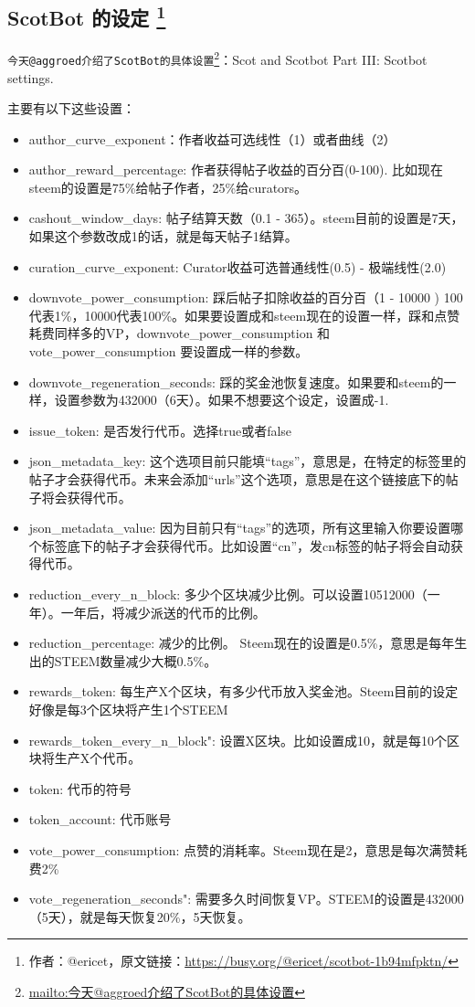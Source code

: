 \documentclass[]{ctexbook}
\providecommand{\tightlist}{%
  \setlength{\itemsep}{0pt}\setlength{\parskip}{0pt}}
\renewcommand{\href}[2]{#2\footnote{\url{#1}}}
\begin{document}
\hypertarget{scotbot-settings}{%
\subsection[ScotBot 的设定 ]{\texorpdfstring{ScotBot 的设定 \footnote{作者：@ericet，原文链接：\url{https://busy.org/@ericet/scotbot-1b94mfpktn/}}}{ScotBot 的设定 }}\label{scotbot-settings}}

\href{mailto:今天@aggroed介绍了ScotBot的具体设置}{\nolinkurl{今天@aggroed介绍了ScotBot的具体设置}}：Scot and Scotbot Part III: Scotbot settings.

主要有以下这些设置：

\begin{itemize}
\tightlist
\item
  author\_curve\_exponent：作者收益可选线性（1）或者曲线（2）
\item
  author\_reward\_percentage: 作者获得帖子收益的百分百(0-100). 比如现在steem的设置是75\%给帖子作者，25\%给curators。
\item
  cashout\_window\_days: 帖子结算天数（0.1 - 365）。steem目前的设置是7天，如果这个参数改成1的话，就是每天帖子1结算。
\item
  curation\_curve\_exponent: Curator收益可选普通线性(0.5) - 极端线性(2.0)
\item
  downvote\_power\_consumption: 踩后帖子扣除收益的百分百（1 - 10000 ) 100代表1\%，10000代表100\%。如果要设置成和steem现在的设置一样，踩和点赞耗费同样多的VP，downvote\_power\_consumption 和 vote\_power\_consumption 要设置成一样的参数。
\item
  downvote\_regeneration\_seconds: 踩的奖金池恢复速度。如果要和steem的一样，设置参数为432000（6天）。如果不想要这个设定，设置成-1.
\item
  issue\_token: 是否发行代币。选择true或者false
\item
  json\_metadata\_key: 这个选项目前只能填``tags''，意思是，在特定的标签里的帖子才会获得代币。未来会添加``urls''这个选项，意思是在这个链接底下的帖子将会获得代币。
\item
  json\_metadata\_value: 因为目前只有``tags''的选项，所有这里输入你要设置哪个标签底下的帖子才会获得代币。比如设置``cn''，发cn标签的帖子将会自动获得代币。
\item
  reduction\_every\_n\_block: 多少个区块减少比例。可以设置10512000（一年）。一年后，将减少派送的代币的比例。
\item
  reduction\_percentage: 减少的比例。 Steem现在的设置是0.5\%，意思是每年生出的STEEM数量减少大概0.5\%。
\item
  rewards\_token: 每生产X个区块，有多少代币放入奖金池。Steem目前的设定好像是每3个区块将产生1个STEEM
\item
  rewards\_token\_every\_n\_block": 设置X区块。比如设置成10，就是每10个区块将生产X个代币。
\item
  token: 代币的符号
\item
  token\_account: 代币账号
\item
  vote\_power\_consumption: 点赞的消耗率。Steem现在是2，意思是每次满赞耗费2\%
\item
  vote\_regeneration\_seconds": 需要多久时间恢复VP。STEEM的设置是432000（5天），就是每天恢复20\%，5天恢复。
\end{itemize}
\end{document}

